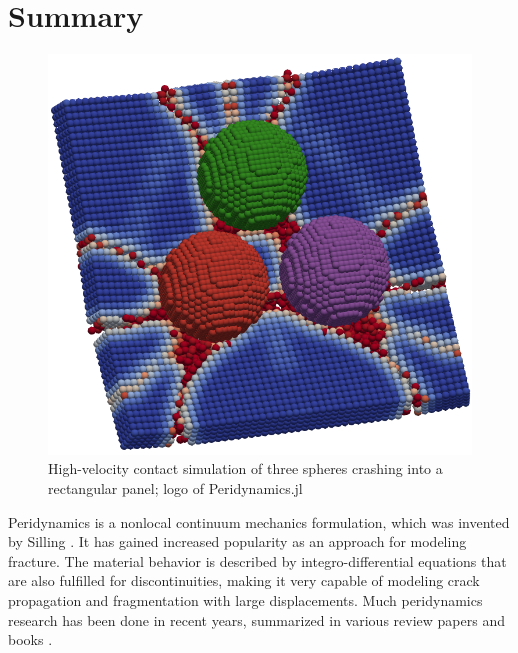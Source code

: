 \documentclass{juliacon}
\begin{document}


\maketitle

\section{Summary}

\begin{figure}
\centerline{\includegraphics[width=0.8\linewidth]{logo.png}}
\caption{High-velocity contact simulation of three spheres crashing into a rectangular panel; logo of Peridynamics.jl}
\label{fig:logo}
\end{figure}

Peridynamics is a nonlocal continuum mechanics formulation, which was invented by Silling \cite{Silling2000}.
It has gained increased popularity as an approach for modeling fracture.
The material behavior is described by integro-differential equations that are also fulfilled for discontinuities, making it very capable of modeling crack propagation and fragmentation with large displacements.
Much peridynamics research has been done in recent years, summarized in various review papers and books \cite{Diehl2019,Javili2019Review,Madenci2014}.
\end{document}
